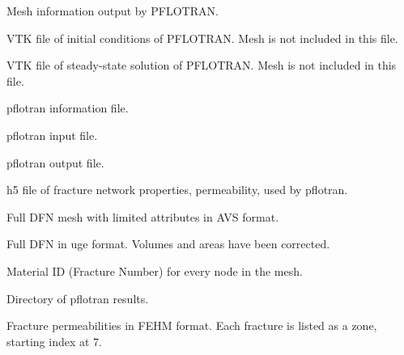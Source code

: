 \documentclass[letterpaper,10pt,english]{sphinxmanual}
\begin{document}

\label{\detokenize{output:cellinfo-dat}}
Mesh information output by PFLOTRAN.


\label{\detokenize{output:dfn-explicit-000-vtk}}
VTK file of initial conditions of PFLOTRAN. Mesh is not included in this file.


\label{\detokenize{output:dfn-explicit-001-vtk}}
VTK file of steady-state solution of PFLOTRAN. Mesh is not included in this file.


\label{\detokenize{output:dfn-explicit-mas-dat}}
pflotran information file.


\label{\detokenize{output:dfn-explicit-in}}
pflotran input file.


\label{\detokenize{output:dfn-explicit-out}}
pflotran output file.


\label{\detokenize{output:dfn-properties-h5}}
h5 file of fracture network properties, permeability, used by pflotran.

Full DFN mesh with limited attributes in AVS format.


\label{\detokenize{output:full-mesh-vol-area-uge}}
Full DFN in uge format. Volumes and areas have been corrected.


\label{\detokenize{output:materialid-dat}}
Material ID (Fracture Number) for every node in the mesh.


\label{\detokenize{output:parsed-vtk}}
Directory of pflotran results.


\label{\detokenize{output:perm-dat}}
Fracture permeabilities in FEHM format. Each fracture is listed as a zone, starting index at 7.
\end{document}
